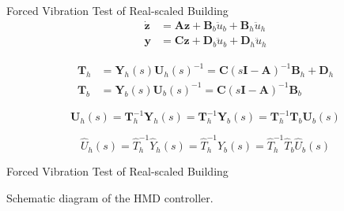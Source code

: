 \documentclass[usepdftitle=false]{beamer}
\newcommand{\matr}[1]{\mathbf{#1}}
\begin{document}
\begin{frame}{Forced Vibration Test of Real-scaled Building}
\begin{equation}\label{eq:7-11}
\begin{aligned}
\matr{\dot{z}}&= \matr{A}\matr{z} + \matr{B}_{b}\ddot{u}_{b}+\matr{B}_{h}\ddot{u}_{h}\\
\matr{y}&=\matr{C}\matr{z}+\matr{D}_{b}\ddot{u}_{b}+\matr{D}_{h}\ddot{u}_{h}
\end{aligned}
\end{equation}

\begin{equation}\label{eq:7-12}
\begin{aligned}
\matr{T}_{h}&=\matr{Y}_{h}(s)\matr{U}_{h}(s)^{-1} = \matr{C}\left(s\matr{I}-\matr{A}\right)^{-1}\matr{B}_{h} + \matr{D}_{h}\\
\matr{T}_{b}&=\matr{Y}_{b}(s)\matr{U}_{b}(s)^{-1} = \matr{C}\left(s\matr{I}-\matr{A}\right)^{-1}\matr{B}_{b}
\end{aligned}
\end{equation}

\begin{equation}\label{eq:7-13}
\matr{U}_{h}(s) = \matr{T}_{h}^{-1}\matr{Y}_{h}(s) = \matr{T}_{h}^{-1}\matr{Y}_{b}(s) = \matr{T}_{h}^{-1}\matr{T}_{b}\matr{U}_{b}(s)
\end{equation}

\begin{equation}\label{eq:7-14}
\hat{U}_{h}(s) = \hat{T}_{h}^{-1}\hat{Y}_{h}(s) = \hat{T}_{h}^{-1}\hat{Y}_{b}(s) = \hat{T}_{h}^{-1}\hat{T}_{b}\hat{U}_{b}(s)
\end{equation}

\end{frame}

\begin{frame}{Forced Vibration Test of Real-scaled Building}
\begin{figure}[!ht]
\centering
\setcounter{subfigure}{0}
\label{fig:7-9}
\end{figure}
Schematic diagram of the HMD controller.
\end{frame}
\end{document}
